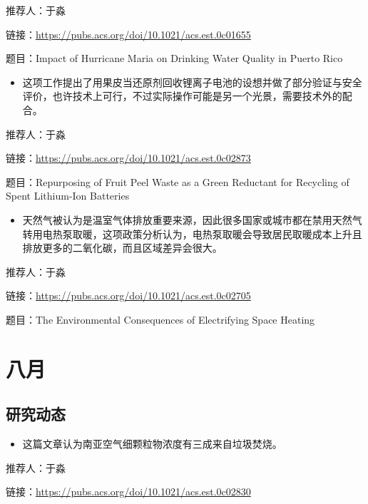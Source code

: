 \documentclass[
]{book}
\providecommand{\tightlist}{%
  \setlength{\itemsep}{0pt}\setlength{\parskip}{0pt}}
\begin{document}
推荐人：于淼

链接：\url{https://pubs.acs.org/doi/10.1021/acs.est.0c01655}

题目：Impact of Hurricane Maria on Drinking Water Quality in Puerto Rico

\begin{itemize}
\tightlist
\item
  这项工作提出了用果皮当还原剂回收锂离子电池的设想并做了部分验证与安全评价，也许技术上可行，不过实际操作可能是另一个光景，需要技术外的配合。
\end{itemize}

推荐人：于淼

链接：\url{https://pubs.acs.org/doi/10.1021/acs.est.0c02873}

题目：Repurposing of Fruit Peel Waste as a Green Reductant for Recycling of Spent Lithium-Ion Batteries

\begin{itemize}
\tightlist
\item
  天然气被认为是温室气体排放重要来源，因此很多国家或城市都在禁用天然气转用电热泵取暖，这项政策分析认为，电热泵取暖会导致居民取暖成本上升且排放更多的二氧化碳，而且区域差异会很大。
\end{itemize}

推荐人：于淼

链接：\url{https://pubs.acs.org/doi/10.1021/acs.est.0c02705}

题目：The Environmental Consequences of Electrifying Space Heating

\hypertarget{ux516bux6708-2}{%
\section*{八月}\label{ux516bux6708-2}}

\hypertarget{ux7814ux7a76ux52a8ux6001-33}{%
\subsection*{研究动态}\label{ux7814ux7a76ux52a8ux6001-33}}

\begin{itemize}
\tightlist
\item
  这篇文章认为南亚空气细颗粒物浓度有三成来自垃圾焚烧。
\end{itemize}

推荐人：于淼

链接：\url{https://pubs.acs.org/doi/10.1021/acs.est.0c02830}
\end{document}
